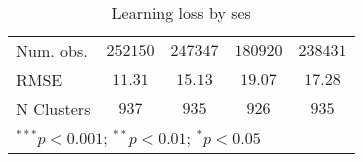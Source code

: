 \begin{table}
\begin{center}
\begin{tabular}{l c c c c}
Num. obs.                   & $252150$      & $247347$      & $180920$      & $238431$      \\
RMSE                        & $11.31$       & $15.13$       & $19.07$       & $17.28$       \\
N Clusters                  & $937$         & $935$         & $926$         & $935$         \\
\hline
\multicolumn{5}{l}{\scriptsize{$^{***}p<0.001$; $^{**}p<0.01$; $^{*}p<0.05$}}
\end{tabular}
\caption{Learning loss by ses}
\label{tableses}
\end{center}
\end{table}
